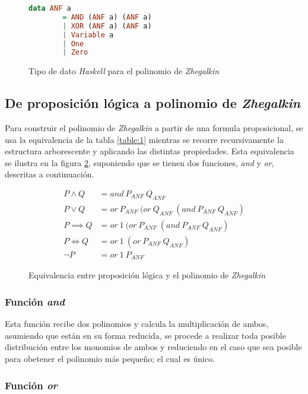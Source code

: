 \begin{figure}
\begin{lstlisting}[language=Haskell]
    data ANF a
        = AND (ANF a) (ANF a)
        | XOR (ANF a) (ANF a)
        | Variable a
        | One
        | Zero
\end{lstlisting}
\caption{Tipo de dato \textit{Haskell} para el polinomio de \textit{Zhegalkin}}
\label{code:anf}
\end{figure}

\subsection{De proposición lógica a polinomio de \textit{Zhegalkin}}
\label{sec:fromProp}

Para construir el polinomio de \textit{Zhegalkin} a partir de una formula proposicional, se usa la equivalencia de la tabla \ref{table:1} mientras se recorre recursivamente la estructura arborescente y aplicando las distintas propiedades. Esta equivalencia se ilustra en la figura \ref{fig:convert}, suponiendo que se tienen dos funciones, \textit{and} y \textit{or}, descritas a continuación.

\begin{figure}
\begin{align*}
P \land Q &= and\ P_{ANF}\ Q_{ANF}\\
P \lor Q &= or\ P_{ANF}\ (or\ Q_{ANF}\ (and\ P_{ANF}\ Q_{ANF})\\
P \implies Q &= or\ 1\ (or\ P_{ANF}\ (and\ P_{ANF}\ Q_{ANF})\\
P \iff Q &= or\ 1\ (or\ P_{ANF}\ Q_{ANF}) \\
\neg P &= or\ 1\ P_{ANF}
\end{align*}
\caption{Equivalencia entre proposición lógica y el polinomio de \textit{Zhegalkin}}
\label{fig:convert}
\end{figure}

\subsubsection{Función \textit{and}}

Esta función recibe dos polinomios y calcula la multiplicación de ambos, asumiendo que están en su forma reducida, se procede a realizar toda posible distribución entre los monomios de ambos y reduciendo en el caso que sea posible para obetener el polinomio más pequeño; el cual es único.

\subsubsection{Función \textit{or}}

